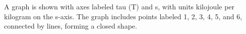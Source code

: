 A graph is shown with axes labeled tau (T) and s, with units kilojoule per kilogram on the s-axis. The graph includes points labeled 1, 2, 3, 4, 5, and 6, connected by lines, forming a closed shape.